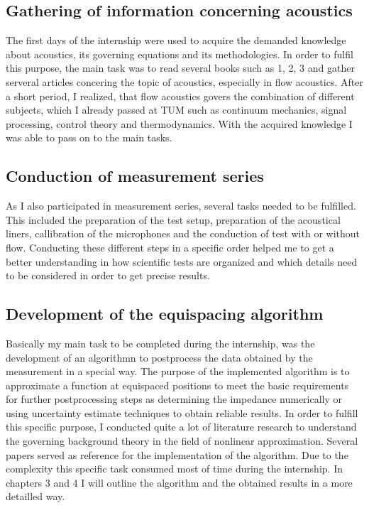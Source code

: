 \documentclass[11pt]{report} %
\begin{document}
\subsection{Gathering of information concerning acoustics } 
The first days of the internship were used to acquire the demanded knowledge about acoustics, its governing equations and its methodologies.
In order to fulfil this purpose, the main task was to read several books such as 1, 2, 3 and gather serveral articles concering the topic of acoustics, especially in flow acoustics. 
After a short period, I realized, that flow acoustics govers the combination of different subjects, which I already passed at TUM such as continuum mechanics, signal processing, control theory and thermodynamics.
With the acquired knowledge I was able to pass on to the main tasks. 

\subsection{Conduction of measurement series}
As I also participated in measurement series, several tasks needed to be fulfilled.
This included the preparation of the test setup, preparation of the acoustical liners, callibration of the microphones and the conduction of test with or without flow.
Conducting these different steps in a specific order helped me to get a better understanding in how scientific tests are organized and which details need to be considered in order to get precise results. 

\subsection{Development of the equispacing algorithm}
Basically my main task to be completed during the internship, was the development of an algorithmn to postprocess the data obtained by the measurement in a special way. 
The purpose of the implemented algorithm is to approximate a function at equispaced positions to meet the basic requirements for further postprocessing steps as determining the impedance numerically or using uncertainty estimate techniques to obtain reliable results.  
In order to fulfill this specific purpose, I conducted quite a lot of literature research to understand the governing background theory in the field of nonlinear approximation.
Several papers served as reference for the implementation of the algorithm. 
Due to the complexity this specific task consumed most of time during the internship.
In chapters 3 and 4 I will outline the algorithm and the obtained results in a more detailled way.
 
\end{document}
